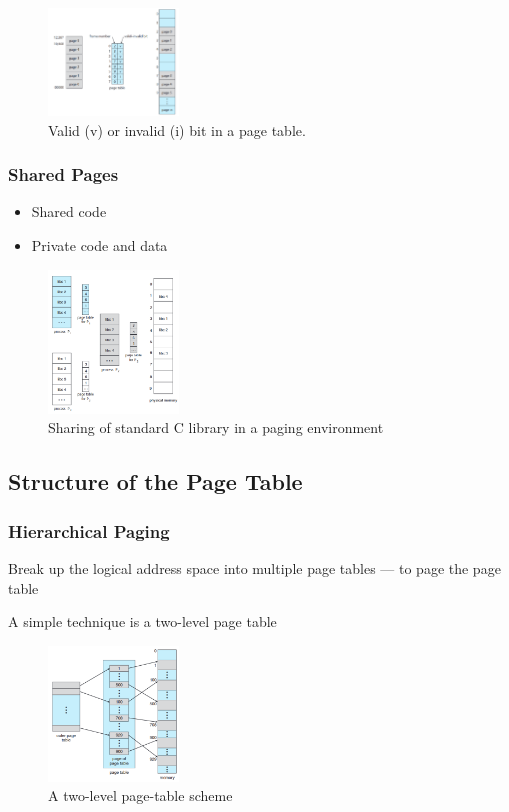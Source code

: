 \begin{figure}[!htb]
    \centering
    \includegraphics[width=0.309\textwidth]{pic/OS8/Valid (v) or invalid (i) bit in a page table.}
    \caption{Valid (v) or invalid (i) bit in a page table.}
\end{figure}

\subsubsection{Shared Pages}
\begin{itemize}
    \item Shared code 
    \item Private code and data
\end{itemize}

\begin{figure}[!htb]
    \centering
    \includegraphics[width=0.309\textwidth]{pic/OS8/Sharing of standard C library in a paging environment}
    \caption{Sharing of standard C library in a paging environment}
\end{figure}


\subsection{Structure of the Page Table}
\subsubsection{Hierarchical Paging}
Break up the logical address space into multiple page tables --- to
page the page table

A simple technique is a two-level page table

\begin{figure}[!htb]
    \centering
    \includegraphics[width=0.309\textwidth]{pic/OS8/A two-level page-table scheme}
    \caption{A two-level page-table scheme}
\end{figure}

